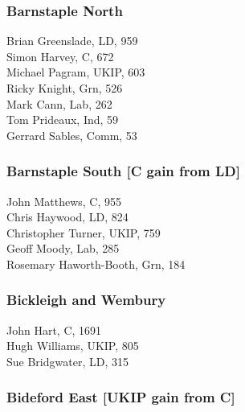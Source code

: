 \documentclass[a4paper,openany,10pt]{book}
\begin{document}
\subsubsection*{Barnstaple North}



Brian Greenslade, LD, 959\\
Simon Harvey, C, 672\\
Michael Pagram, UKIP, 603\\
Ricky Knight, Grn, 526\\
Mark Cann, Lab, 262\\
Tom Prideaux, Ind, 59\\
Gerrard Sables, Comm, 53\\


\subsubsection*{Barnstaple South \hspace*{\fill}\nolinebreak[1]%
\enspace\hspace*{\fill}
[C gain from LD]}



John Matthews, C, 955\\
Chris Haywood, LD, 824\\
Christopher Turner, UKIP, 759\\
Geoff Moody, Lab, 285\\
Rosemary Haworth-Booth, Grn, 184\\


\subsubsection*{Bickleigh and Wembury}



John Hart, C, 1691\\
Hugh Williams, UKIP, 805\\
Sue Bridgwater, LD, 315\\


\subsubsection*{Bideford East \hspace*{\fill}\nolinebreak[1]%
\enspace\hspace*{\fill}
[UKIP gain from C]}
\end{document}
